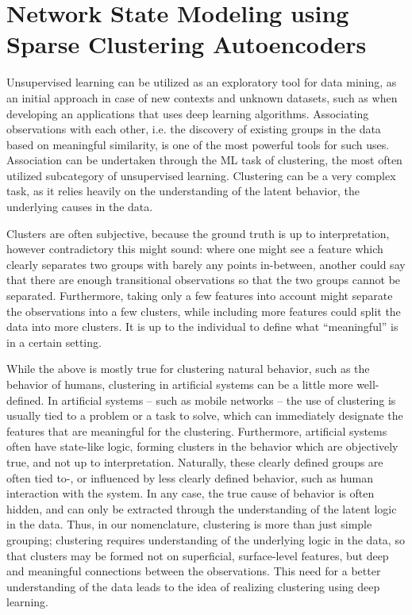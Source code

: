 \chapter{Network State Modeling using Sparse Clustering Autoencoders}
	\label{cha:sparse_clust}
	   	
   	Unsupervised learning can be utilized as an	exploratory tool for data mining, as an initial approach in case of new contexts and unknown datasets, such as when developing an applications that uses deep learning algorithms.
   	Associating observations with each other, i.e. the discovery of existing groups in the data based on meaningful similarity, is one of the most powerful tools for such uses.
   	Association can be undertaken through the \ac{ML} task of clustering, the most often utilized subcategory of unsupervised learning.   	
   	Clustering can be a very complex task, as it relies heavily on the understanding of the latent behavior, the underlying causes in the data.
   	
   	Clusters are often subjective, because the ground truth is up to interpretation, however contradictory this might sound: where one might see a feature which clearly separates two groups with barely any points in-between, another could say that there are enough transitional observations so that the two groups cannot be separated.
   	Furthermore, taking only a few features into account might separate the observations into a few clusters, while including more features could split the data into more clusters.
   	It is up to the individual to define what ``meaningful'' is in a certain setting.
   	
   	While the above is mostly true for clustering natural behavior, such as the behavior of humans, clustering in artificial systems can be a little more well-defined.
   	In artificial systems -- such as mobile networks -- the use of clustering is usually tied to a problem or a task to solve, which can immediately designate the features that are meaningful for the clustering.
   	Furthermore, artificial systems often have state-like logic, forming clusters in the behavior which are objectively true, and not up to interpretation.
   	Naturally, these clearly defined groups are often tied to-, or influenced by less clearly defined behavior, such as human interaction with the system.
   	In any case, the true cause of behavior is often hidden, and can only be extracted through the understanding of the latent logic in the data. 	
   	Thus, in our nomenclature, clustering is more than just simple grouping; clustering requires understanding of the underlying logic in the data, so that clusters may be formed not on superficial, surface-level features, but deep and meaningful connections between the observations.
   	This need for a better understanding of the data leads to the idea of realizing clustering using deep learning.
   	

